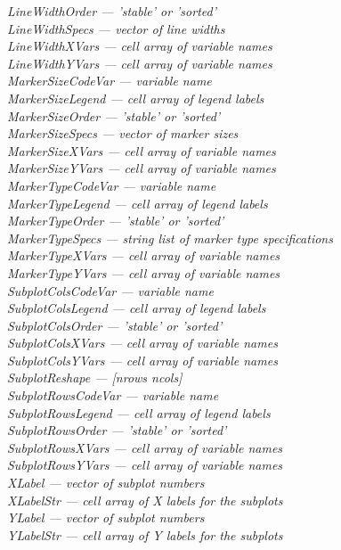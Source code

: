 \documentclass{article}
\newcommand{\namevalue}[2]{{\it #1 --- #2}}
\begin{document}
\namevalue{LineWidthOrder}{'stable' or 'sorted'} \\
\namevalue{LineWidthSpecs}{vector of line widths} \\
\namevalue{LineWidthXVars}{cell array of variable names} \\
\namevalue{LineWidthYVars}{cell array of variable names} \\
\namevalue{MarkerSizeCodeVar}{variable name} \\
\namevalue{MarkerSizeLegend}{cell array of legend labels} \\
\namevalue{MarkerSizeOrder}{'stable' or 'sorted'} \\
\namevalue{MarkerSizeSpecs}{vector of marker sizes} \\
\namevalue{MarkerSizeXVars}{cell array of variable names} \\
\namevalue{MarkerSizeYVars}{cell array of variable names} \\
\namevalue{MarkerTypeCodeVar}{variable name} \\
\namevalue{MarkerTypeLegend}{cell array of legend labels} \\
\namevalue{MarkerTypeOrder}{'stable' or 'sorted'} \\
\namevalue{MarkerTypeSpecs}{string list of marker type specifications} \\
\namevalue{MarkerTypeXVars}{cell array of variable names} \\
\namevalue{MarkerTypeYVars}{cell array of variable names} \\
\namevalue{SubplotColsCodeVar}{variable name} \\
\namevalue{SubplotColsLegend}{cell array of legend labels} \\
\namevalue{SubplotColsOrder}{'stable' or 'sorted'} \\
\namevalue{SubplotColsXVars}{cell array of variable names} \\
\namevalue{SubplotColsYVars}{cell array of variable names} \\
\namevalue{SubplotReshape}{[nrows ncols]} \\
\namevalue{SubplotRowsCodeVar}{variable name} \\
\namevalue{SubplotRowsLegend}{cell array of legend labels} \\
\namevalue{SubplotRowsOrder}{'stable' or 'sorted'} \\
\namevalue{SubplotRowsXVars}{cell array of variable names} \\
\namevalue{SubplotRowsYVars}{cell array of variable names} \\
\namevalue{XLabel}{vector of subplot numbers} \\
\namevalue{XLabelStr}{cell array of X labels for the subplots} \\
\namevalue{YLabel}{vector of subplot numbers} \\
\namevalue{YLabelStr}{cell array of Y labels for the subplots} \\
\end{document}
